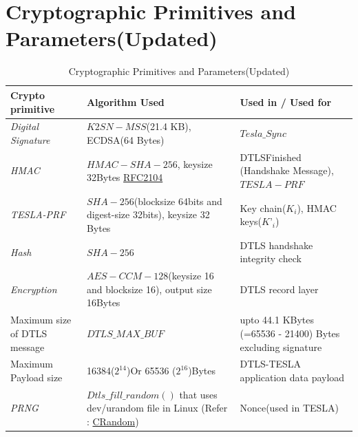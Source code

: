 \section{Cryptographic Primitives and Parameters(Updated) \cite{srtptesla}}
\begin{minipage}{18cm}
\begin{table}[H]
\caption{Cryptographic Primitives and Parameters(Updated) }
\label{cryptoTable}
\begin{tabular}{ |p{5cm}|p{5cm}|p{5cm}|}
\hline
\hline
\textbf{Crypto primitive} & \textbf{Algorithm Used} & \textbf{Used in / Used for}\\
 \hline
 \hline
\textit{Digital Signature} & $K2SN-MSS$(21.4 KB), ECDSA(64 Bytes) & $Tesla\_Sync$ \\ 
 \hline 
\textit{HMAC} & $HMAC-SHA-256$, keysize 32Bytes \href{https://tools.ietf.org/html/rfc2104}{RFC2104} & DTLSFinished
(Handshake Message), $TESLA-PRF$\\
\hline
\textit{TESLA-PRF} & $SHA-256$(blocksize 64bits and digest-size 32bits), keysize 32 Bytes & Key chain($K_{i}$), HMAC keys($K’_{i}$)\\
 \hline
 \textit{Hash} & $SHA-256$ & DTLS handshake integrity check\\
 
 \hline
 \textit{Encryption} & $AES-CCM-128$(keysize 16 and blocksize 16), output size 16Bytes & DTLS record layer\\
 \hline
 Maximum size of DTLS message & $DTLS\_MAX\_BUF$ & upto 44.1 KBytes (=65536 - 21400) Bytes excluding signature \\
 \hline
 Maximum Payload size & 16384($2^{14}$)Or 65536 ($2^{16}$)Bytes & DTLS-TESLA application data payload\\
\hline
 \textit{PRNG} & $Dtls\_fill\_random()$ that uses dev/urandom file in Linux (Refer : \href{http://cs.yale.edu/homes/aspnes/pinewiki/C(2f)Randomization.html}{CRandom}) & Nonce(used in TESLA) \\
 \hline
\end{tabular}\\

\end{table}
\end{minipage}    



